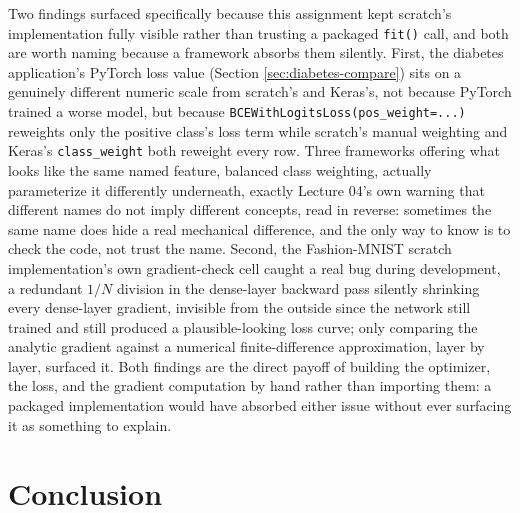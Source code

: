 \documentclass[11pt]{article}
\newcommand{\code}[1]{\texttt{#1}}
\begin{document}
Two findings surfaced specifically because this assignment kept scratch's
implementation fully visible rather than trusting a packaged \code{fit()}
call, and both are worth naming because a framework absorbs them silently.
First, the diabetes application's PyTorch loss value (Section
\ref{sec:diabetes-compare}) sits on a genuinely different numeric scale from
scratch's and Keras's, not because PyTorch trained a worse model, but because
\code{BCEWithLogitsLoss(pos\_weight=...)} reweights only the positive class's
loss term while scratch's manual weighting and Keras's \code{class\_weight}
both reweight every row. Three frameworks offering what looks like the same
named feature, balanced class weighting, actually parameterize it
differently underneath, exactly Lecture 04's own warning that different names
do not imply different concepts, read in reverse: sometimes the same name
does hide a real mechanical difference, and the only way to know is to check
the code, not trust the name. Second, the Fashion-MNIST scratch
implementation's own gradient-check cell caught a real bug during
development, a redundant $1/N$ division in the dense-layer backward pass
silently shrinking every dense-layer gradient, invisible from the outside
since the network still trained and still produced a plausible-looking loss
curve; only comparing the analytic gradient against a numerical
finite-difference approximation, layer by layer, surfaced it. Both findings
are the direct payoff of building the optimizer, the loss, and the gradient
computation by hand rather than importing them: a packaged implementation
would have absorbed either issue without ever surfacing it as something to
explain.

\section{Conclusion}
\end{document}
